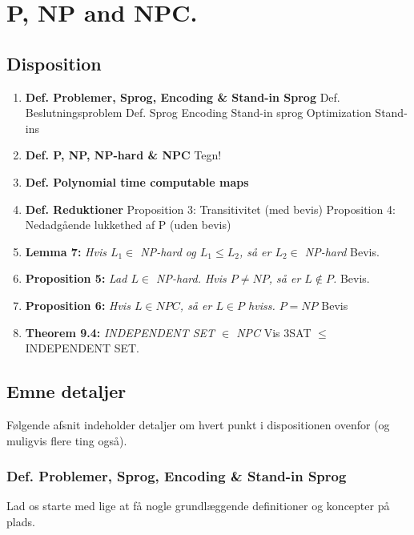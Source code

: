 \section{P, NP and NPC.}

\subsection{Disposition}

\begin{enumerate}
 \item \textbf{Def. Problemer, Sprog, Encoding \& Stand-in Sprog}
    \subitem Def. Beslutningsproblem
    \subitem Def. Sprog
    \subitem Encoding
    \subitem Stand-in sprog
    \subitem Optimization Stand-ins
 \item \textbf{Def. P, NP, NP-hard \& NPC}
    \subitem  Tegn!
 \item \textbf{Def. Polynomial time computable maps}
 \item \textbf{Def. Reduktioner}
    \subitem  Proposition 3: Transitivitet (med bevis)
    \subitem  Proposition 4: Nedadgående lukkethed af P (uden bevis)
 \item \textbf{Lemma 7:} \textit{Hvis $L_1 \in$ NP-hard og $L_1 \leq L_2$, så er $L_2 \in$ NP-hard}
    \subitem  Bevis.
 \item \textbf{Proposition 5:} \textit{Lad $L \in$ NP-hard. Hvis $P \neq NP$, så er $L \notin P$.}
    \subitem  Bevis.
 \item \textbf{Proposition 6:} \textit{Hvis $L \in NPC$, så er $L \in P$ hviss. $P=NP$}
    \subitem  Bevis
 \item \textbf{Theorem 9.4:} \textit{INDEPENDENT SET $\in$ NPC}
    \subitem Vis 3SAT $\leq$ INDEPENDENT SET.
\end{enumerate}

\subsection{Emne detaljer}

Følgende afsnit indeholder detaljer om hvert punkt i dispositionen ovenfor (og muligvis flere ting også).

\subsubsection{Def. Problemer, Sprog, Encoding \& Stand-in Sprog}

Lad os starte med lige at få nogle grundlæggende definitioner og koncepter på plads. 

